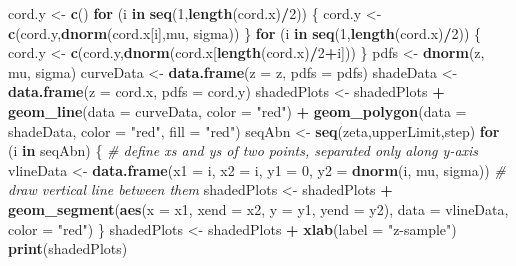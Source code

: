 \documentclass[
]{book}
\newenvironment{Shaded}{\begin{snugshade}}{\end{snugshade}}
\newcommand{\CommentTok}[1]{\textcolor[rgb]{0.56,0.35,0.01}{\textit{#1}}}
\newcommand{\ControlFlowTok}[1]{\textcolor[rgb]{0.13,0.29,0.53}{\textbf{#1}}}
\newcommand{\DataTypeTok}[1]{\textcolor[rgb]{0.13,0.29,0.53}{#1}}
\newcommand{\DecValTok}[1]{\textcolor[rgb]{0.00,0.00,0.81}{#1}}
\newcommand{\KeywordTok}[1]{\textcolor[rgb]{0.13,0.29,0.53}{\textbf{#1}}}
\newcommand{\NormalTok}[1]{#1}
\newcommand{\OperatorTok}[1]{\textcolor[rgb]{0.81,0.36,0.00}{\textbf{#1}}}
\newcommand{\StringTok}[1]{\textcolor[rgb]{0.31,0.60,0.02}{#1}}
\begin{document}
\begin{Shaded}
\begin{Highlighting}[]
\NormalTok{cord.y \textless{}{-}}\StringTok{ }\KeywordTok{c}\NormalTok{()}
\ControlFlowTok{for}\NormalTok{ (i }\ControlFlowTok{in} \KeywordTok{seq}\NormalTok{(}\DecValTok{1}\NormalTok{,}\KeywordTok{length}\NormalTok{(cord.x)}\OperatorTok{/}\DecValTok{2}\NormalTok{)) \{}
\NormalTok{  cord.y \textless{}{-}}\StringTok{ }\KeywordTok{c}\NormalTok{(cord.y,}\KeywordTok{dnorm}\NormalTok{(cord.x[i],mu, sigma))}
\NormalTok{\}}
\ControlFlowTok{for}\NormalTok{ (i }\ControlFlowTok{in} \KeywordTok{seq}\NormalTok{(}\DecValTok{1}\NormalTok{,}\KeywordTok{length}\NormalTok{(cord.x)}\OperatorTok{/}\DecValTok{2}\NormalTok{)) \{}
\NormalTok{  cord.y \textless{}{-}}\StringTok{ }\KeywordTok{c}\NormalTok{(cord.y,}\KeywordTok{dnorm}\NormalTok{(cord.x[}\KeywordTok{length}\NormalTok{(cord.x)}\OperatorTok{/}\DecValTok{2}\OperatorTok{+}\NormalTok{i]))}
\NormalTok{\}}
\NormalTok{pdfs \textless{}{-}}\StringTok{ }\KeywordTok{dnorm}\NormalTok{(z, mu, sigma)}
\NormalTok{curveData \textless{}{-}}\StringTok{ }\KeywordTok{data.frame}\NormalTok{(}\DataTypeTok{z =}\NormalTok{ z, }\DataTypeTok{pdfs =}\NormalTok{ pdfs)}
\NormalTok{shadeData \textless{}{-}}\StringTok{ }\KeywordTok{data.frame}\NormalTok{(}\DataTypeTok{z =}\NormalTok{ cord.x, }\DataTypeTok{pdfs =}\NormalTok{ cord.y)}
\NormalTok{shadedPlots \textless{}{-}}\StringTok{ }\NormalTok{shadedPlots }\OperatorTok{+}\StringTok{ }
\StringTok{  }\KeywordTok{geom\_line}\NormalTok{(}\DataTypeTok{data =}\NormalTok{ curveData, }\DataTypeTok{color =} \StringTok{"red"}\NormalTok{) }\OperatorTok{+}\StringTok{ }
\StringTok{  }\KeywordTok{geom\_polygon}\NormalTok{(}\DataTypeTok{data =}\NormalTok{ shadeData, }\DataTypeTok{color =} \StringTok{"red"}\NormalTok{, }\DataTypeTok{fill =} \StringTok{"red"}\NormalTok{)}
\NormalTok{seqAbn \textless{}{-}}\StringTok{ }\KeywordTok{seq}\NormalTok{(zeta,upperLimit,step)}
\ControlFlowTok{for}\NormalTok{ (i }\ControlFlowTok{in}\NormalTok{ seqAbn) \{}
  \CommentTok{\# define xs and ys of two points, separated only along y{-}axis}
\NormalTok{  vlineData \textless{}{-}}\StringTok{ }\KeywordTok{data.frame}\NormalTok{(}\DataTypeTok{x1 =}\NormalTok{ i, }
                          \DataTypeTok{x2 =}\NormalTok{ i, }
                          \DataTypeTok{y1 =} \DecValTok{0}\NormalTok{, }
                          \DataTypeTok{y2 =} \KeywordTok{dnorm}\NormalTok{(i, mu, sigma))}
  \CommentTok{\# draw vertical line between them}
\NormalTok{  shadedPlots \textless{}{-}}\StringTok{ }\NormalTok{shadedPlots }\OperatorTok{+}\StringTok{ }
\StringTok{    }\KeywordTok{geom\_segment}\NormalTok{(}\KeywordTok{aes}\NormalTok{(}\DataTypeTok{x =}\NormalTok{ x1, }\DataTypeTok{xend =}\NormalTok{ x2, }\DataTypeTok{y =}\NormalTok{ y1, }\DataTypeTok{yend =}\NormalTok{ y2), }
                 \DataTypeTok{data =}\NormalTok{ vlineData, }\DataTypeTok{color =} \StringTok{"red"}\NormalTok{)}
\NormalTok{\}}
\NormalTok{shadedPlots \textless{}{-}}\StringTok{ }\NormalTok{shadedPlots }\OperatorTok{+}\StringTok{ }\KeywordTok{xlab}\NormalTok{(}\DataTypeTok{label =} \StringTok{"z{-}sample"}\NormalTok{)}
\KeywordTok{print}\NormalTok{(shadedPlots)}
\end{Highlighting}
\end{Shaded}
\end{document}

